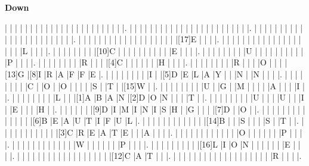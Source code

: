 \documentclass{article}
\begin{document}
\begin{PuzzleClues}{\textbf{Down}}

\end{PuzzleClues}

\clearpage

\PuzzleSolution

\begin{Puzzle}{23}{23}
	|{}	|{}	|{}	|{}	|{}	|{}	|{}	|{}	|{}	|{}	|{}	|{}	|{}	|{}	|{}	|{}	|{}	|{}	|{}	|{}	|{}	|{}	|{}	|.
	|{}	|{}	|{}	|{}	|{}	|{}	|{}	|{}	|{}	|{}	|{}	|{}	|{}	|{}	|{}	|{}	|{}	|{}	|{}	|{}	|{}	|{}	|{}	|.
	|{}	|{}	|{}	|{}	|{}	|{}	|{}	|{}	|{}	|{}	|{}	|{}	|{}	|{}	|{}	|{}	|{}	|{}	|{}	|{}	|{}	|{}	|{}	|.
	|{}	|{}	|{}	|{}	|{}	|{}	|{}	|{}	|{}	|{}	|{}	|{}	|{}	|{}	|{}	|{}	|{}	|{}	|{}	|[17]E	|{}	|{}	|{}	|.
	|{}	|{}	|{}	|{}	|{}	|{}	|{}	|{}	|{}	|{}	|{}	|{}	|{}	|{}	|{}	|{}	|{}	|{}	|{}	|L	|{}	|{}	|{}	|.
	|{}	|{}	|{}	|{}	|{}	|{}	|{}	|{}	|[10]C	|{}	|{}	|{}	|{}	|{}	|{}	|{}	|{}	|{}	|{}	|E	|{}	|{}	|{}	|.
	|{}	|{}	|{}	|{}	|{}	|{}	|{}	|{}	|U	|{}	|{}	|{}	|{}	|{}	|{}	|{}	|{}	|{}	|{}	|P	|{}	|{}	|{}	|.
	|{}	|{}	|{}	|{}	|{}	|{}	|{}	|{}	|R	|{}	|{}	|{}	|[4]C	|{}	|{}	|{}	|{}	|{}	|{}	|H	|{}	|{}	|{}	|.
	|{}	|{}	|{}	|{}	|{}	|{}	|{}	|{}	|R	|{}	|{}	|{}	|O	|{}	|{}	|{}	|[13]G	|[8]I	|R	|A	|F	|F	|E	|.
	|{}	|{}	|{}	|{}	|{}	|{}	|{}	|{}	|I	|{}	|[5]D	|E	|L	|A	|Y	|{}	|{}	|N	|{}	|N	|{}	|{}	|{}	|.
	|{}	|{}	|{}	|{}	|{}	|{}	|{}	|{}	|C	|{}	|O	|{}	|O	|{}	|{}	|{}	|{}	|S	|{}	|T	|{}	|[15]W	|{}	|.
	|{}	|{}	|{}	|{}	|{}	|{}	|{}	|{}	|U	|{}	|G	|{}	|M	|{}	|{}	|{}	|{}	|A	|{}	|{}	|{}	|I	|{}	|.
	|{}	|{}	|{}	|{}	|{}	|{}	|{}	|{}	|L	|{}	|{}	|[1]A	|B	|A	|N	|[2]D	|O	|N	|{}	|{}	|{}	|T	|{}	|.
	|{}	|{}	|{}	|{}	|{}	|{}	|{}	|{}	|U	|{}	|{}	|{}	|U	|{}	|{}	|I	|{}	|E	|{}	|{}	|{}	|H	|{}	|.
	|{}	|{}	|{}	|{}	|{}	|{}	|[9]D	|I	|M	|I	|N	|I	|S	|H	|{}	|G	|{}	|{}	|{}	|[7]D	|{}	|O	|{}	|.
	|{}	|{}	|{}	|{}	|{}	|{}	|{}	|{}	|{}	|{}	|{}	|{}	|{}	|{}	|[6]B	|E	|A	|U	|T	|I	|F	|U	|L	|.
	|{}	|{}	|{}	|{}	|{}	|{}	|{}	|{}	|{}	|{}	|{}	|{}	|[14]B	|{}	|{}	|S	|{}	|{}	|{}	|S	|{}	|T	|{}	|.
	|{}	|{}	|{}	|{}	|{}	|{}	|{}	|{}	|{}	|{}	|{}	|[3]C	|R	|E	|A	|T	|E	|{}	|{}	|A	|{}	|{}	|{}	|.
	|{}	|{}	|{}	|{}	|{}	|{}	|{}	|{}	|{}	|{}	|{}	|{}	|O	|{}	|{}	|{}	|{}	|{}	|{}	|P	|{}	|{}	|{}	|.
	|{}	|{}	|{}	|{}	|{}	|{}	|{}	|{}	|{}	|{}	|{}	|{}	|W	|{}	|{}	|{}	|{}	|{}	|{}	|P	|{}	|{}	|{}	|.
	|{}	|{}	|{}	|{}	|{}	|{}	|{}	|{}	|{}	|[16]L	|I	|O	|N	|{}	|{}	|{}	|{}	|{}	|{}	|E	|{}	|{}	|{}	|.
	|{}	|{}	|{}	|{}	|{}	|{}	|{}	|{}	|{}	|{}	|{}	|{}	|{}	|{}	|{}	|{}	|{}	|{}	|[12]C	|A	|T	|{}	|{}	|.
	|{}	|{}	|{}	|{}	|{}	|{}	|{}	|{}	|{}	|{}	|{}	|{}	|{}	|{}	|{}	|{}	|{}	|{}	|{}	|R	|{}	|{}	|{}	|.
\end{Puzzle}
\end{document}

